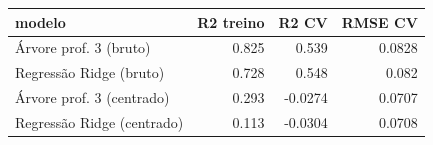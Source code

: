 \begin{tabular}{lrrr}
\hline
modelo & R2 treino & R2 CV & RMSE CV \\
\hline
Árvore prof. 3 (bruto) & 0.825 & 0.539 & 0.0828 \\
Regressão Ridge (bruto) & 0.728 & 0.548 & 0.082 \\
Árvore prof. 3 (centrado) & 0.293 & -0.0274 & 0.0707 \\
Regressão Ridge (centrado) & 0.113 & -0.0304 & 0.0708 \\
\hline
\end{tabular}
